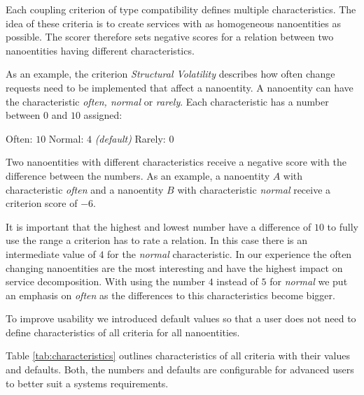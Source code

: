 Each coupling criterion of type compatibility defines multiple characteristics. The idea of these criteria is to create services with as homogeneous nanoentities as possible. The scorer therefore sets negative scores for a relation between two nanoentities having different characteristics. 

As an example, the criterion \textit{Structural Volatility} describes how often change requests need to be implemented that affect a nanoentity. A nanoentity can have the characteristic \textit{often, normal} or \textit{rarely}. Each characteristic has a number between $0$ and $10$ assigned:

Often: $10$ \newline
Normal: $4$ \textit{(default)} \newline
Rarely: $0$ \newline

Two nanoentities with different characteristics receive a negative score with the difference between the numbers. As an example, a nanoentity $A$ with characteristic \textit{often} and a nanoentity $B$ with characteristic \textit{normal} receive a criterion score of $-6$. 

It is important that the highest and lowest number have a difference of $10$ to fully use the range a criterion has to rate a relation. \newline In this case there is an intermediate value of $4$ for the \textit{normal} characteristic. In our experience the often changing nanoentities are the most interesting and have the highest impact on service decomposition. With using the number $4$ instead of $5$ for \textit{normal} we put an emphasis on \textit{often} as the differences to this characteristics become bigger. 

To improve usability we introduced default values so that a user does not need to define characteristics of all criteria for all nanoentities. 

Table \ref{tab:characteristics} outlines characteristics of all criteria with their values and defaults. Both, the numbers and defaults are configurable for advanced users to better suit a systems requirements. 


